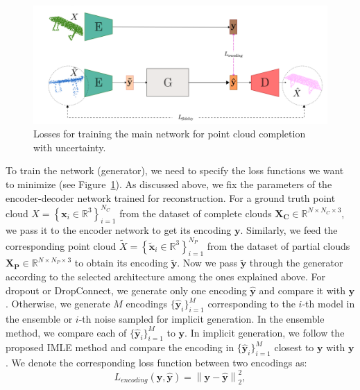         \begin{figure}[htb]
          \begin{center}
          \includegraphics[width=\linewidth]{figures/losses_main_network.png}
          \end{center}
          \caption{Losses for training the main network for point cloud completion with uncertainty.}\label{fig:losses_main}
        \end{figure}
        To train the network (generator), we need to specify the loss functions we want to minimize (see Figure~\ref{fig:losses_main}). As discussed above, we fix the parameters of the encoder-decoder network trained for reconstruction. For a ground truth point cloud $X=\left\{\mathbf{x}_{i} \in \mathbb{R}^{3}\right\}_{i=1}^{N_C}$ from the dataset of complete clouds $\mathbf{X_C} \in \mathbb{R}^{N \times N_C \times 3}$, we pass it to the encoder network to get its encoding $\mathbf{y}$. Similarly, we feed the corresponding point cloud $\tilde{X}=\left\{\mathbf{\tilde{x}}_{i} \in \mathbb{R}^{3}\right\}_{i=1}^{N_P}$ from the dataset of partial clouds $\mathbf{X_P} \in \mathbb{R}^{N \times N_P \times 3}$ to obtain its encoding $\mathbf{\tilde{y}}$. Now we pass $\mathbf{\tilde{y}}$ through the generator according to the selected architecture among the ones explained above. For dropout or DropConnect, we generate only one encoding $\mathbf{\hat{y}}$ and compare it with $\mathbf{y}$. Otherwise, we generate $M$ encodings $\{\mathbf{\hat{y}}_i\}_{i=1}^M$ corresponding to the $i$-th model in the ensemble or $i$-th noise sampled for implicit generation. In the ensemble method, we compare each of $\{\mathbf{\hat{y}}_i\}_{i=1}^M$ to $\mathbf{y}$. In implicit generation, we follow the proposed IMLE method and compare the encoding in $\{\mathbf{\hat{y}}_i\}_{i=1}^M$ closest to $\mathbf{y}$ with $\mathbf{y}$. We denote the corresponding loss function between two encodings as:
        \begin{equation}\label{latent_loss}
            L_{encoding}(\mathbf{y}, \mathbf{\hat{y}}) = \left\|\mathbf{y} - \mathbf{\hat{y}}\right\|_2^2,
        \end{equation}
